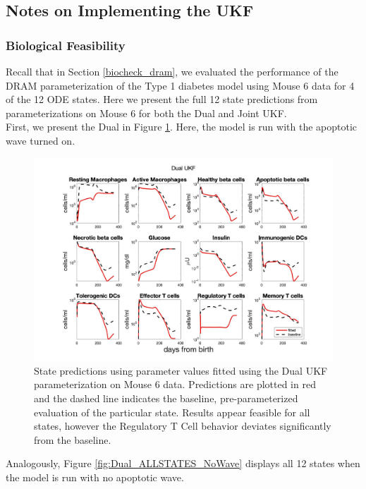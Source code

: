 \begin{appendices}
\subsection{Notes on Implementing the UKF}
\subsubsection{Biological Feasibility}
Recall that in Section \ref{biocheck_dram}, we evaluated the performance of the DRAM parameterization of the Type 1 diabetes model using Mouse 6 data for 4 of the 12 ODE states. Here we present the full 12 state predictions from parameterizations on Mouse 6 for both the Dual and Joint UKF.\\

First, we present the Dual in Figure \ref{fig:Dual_ALLSTATES_Wave}. Here, the model is run with the apoptotic wave turned on.

\begin{figure}[H] 
    \centering
    \includegraphics[width=15cm]{Kalman_Filter_Images/States_With_Wave_ALL_WithBaseline.jpg}
    \caption{State predictions using parameter values fitted using the Dual UKF parameterization on Mouse 6 data. Predictions are plotted in red and the dashed line indicates the baseline, pre-parameterized evaluation of the particular state. Results appear feasible for all states, however the Regulatory T Cell behavior deviates significantly from the baseline.}
    \label{fig:Dual_ALLSTATES_Wave}
\end{figure}

Analogously, Figure \ref{fig:Dual_ALLSTATES_NoWave} displays all 12 states when the model is run with no apoptotic wave.


\end{appendices}
